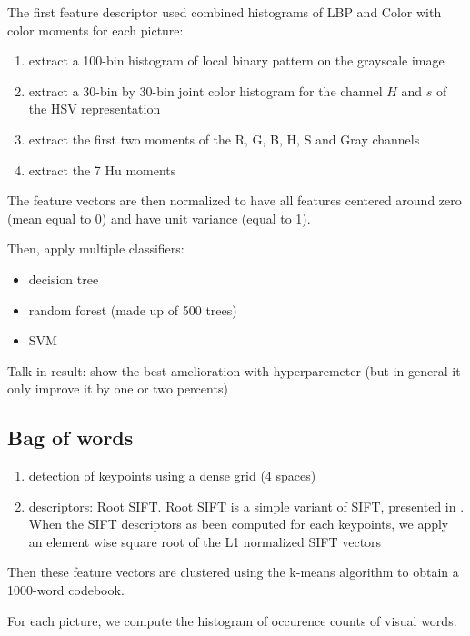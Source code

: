 The first feature descriptor used combined histograms of LBP and Color with color moments for each picture:
\begin{enumerate}
    \item extract a 100-bin histogram of local binary pattern on the grayscale image
    \item extract a 30-bin by 30-bin joint color histogram for the channel $H$ and $s$ of the HSV  representation
    \item extract the first two moments of the R, G, B, H, S and Gray channels
    \item extract the 7 Hu moments
\end{enumerate}

The feature vectors are then normalized to have all features centered around zero (mean equal to 0) and have unit variance (equal to 1).

Then, apply multiple classifiers:
\begin{itemize}
    \item decision tree
    \item random forest (made up of 500 trees)
    \item SVM
\end{itemize}

Talk in result: show the best amelioration with hyperparemeter (but in general it only improve it by one or two percents)

\subsection{Bag of words}

\begin{enumerate}
    \item detection of keypoints using a dense grid (4 spaces)
    \item descriptors: Root SIFT. Root SIFT is a simple variant of SIFT, presented in \cite{Arandjelovic2012}. When the SIFT descriptors as been computed for each keypoints, we apply an element wise square root of the L1 normalized SIFT vectors
\end{enumerate}

Then these feature vectors are clustered using the k-means algorithm to obtain a 1000-word codebook.

For each picture, we compute the histogram of occurence counts of visual words.

